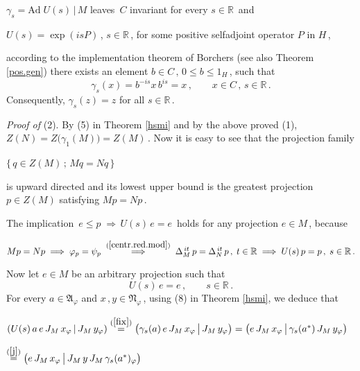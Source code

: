 \documentclass[reqno]{amsart}
\theoremstyle{definition}
\theoremstyle{remark}
\numberwithin{equation}{section}
\theoremstyle{plain}
\begin{document}
\noindent\hspace{0.6 cm} $\gamma_s =\text{Ad}\; U(s)\, |\, M$
leaves $\, C$ invariant for every $s\in\mathbb R\,$ and
\smallskip

\noindent\hspace{0.6 cm} $U(s)=\exp (isP)\,$, $s\in\mathbb R\,$,
for some positive selfadjoint operator $P$ in $H\,$,
\smallskip

\noindent according to the implementation theorem of Borchers
\cite{Bo1} (see also Theorem \ref{pos.gen}) there exists an
element $b\in C\, ,\, 0\leq b\leq 1_H\,$, such that
\begin{equation*}
\gamma_s (x) =b^{-is} x\, b^{is} =x\, ,\qquad x\in C\, ,\,
s\in\mathbb R\, .
\end{equation*}
Consequently, $\gamma_s (z) =z$ for all $s\in\mathbb R\,$.
\medskip

{\it Proof of }(2).
By (5) in Theorem \ref{hsmi} and by the above proved (1), $Z(N)=
Z\big(\gamma_1 (M)\big) =Z(M)\,$. Now it is easy to see that
the projection family
\begin{center}
$\{\, q\in Z(M)\, ;\, M q =N q\,\}$
\end{center}
is upward directed and its lowest upper bound is the greatest
projection $p\in Z(M)$ satisfying $M p =N p\,$.

The implication $\, e\leq p\;\Longrightarrow\, U(s)\, e=e\,$
holds for any projection $e\in M\,$, because
\begin{center}
$M p =N p\;\Longrightarrow\; \varphi_p =\psi_p
\;\overset{(\ref{centr.red.mod})}{\Longrightarrow}\;
\Delta_M^{\, it}\, p = \Delta_N^{\, it}\, p\, ,\; t\in\mathbb R
\;\Longrightarrow\; U(s)\, p =p\, ,\; s\in\mathbb R\, .$
\end{center}
\medskip

Now let $e\in M$ be an arbitrary projection such that
\begin{equation}\label{fix}
U(s)\, e=e\, ,\qquad s\in\mathbb R\, .
\end{equation}
For every $a\in\mathfrak A_\varphi$ and $x\, , y\in
\mathfrak N_\varphi\,$, using (8) in Theorem \ref{hsmi}, we
deduce that
\begin{center}
$( U(s)\, a\, e\, J_M\, x_\varphi\, |\, J_M\, y_\varphi )
\overset{(\ref{fix})}{=}
\big(\gamma_s (a)\, e\, J_M\, x_\varphi\,\big|\, J_M\, y_\varphi
\big) =\big( e\, J_M\, x_\varphi\,\big|\, \gamma_s (a^*)\, J_M\,
y_\varphi\big)$
\end{center}

\noindent\hspace{3.88 cm} $\overset{(\ref{j})}{=} \big( e\, J_M\,
x_\varphi\,\big|\, J_M\, y\, J_M\,\gamma_s (a^*)_\varphi\big)$
\smallskip
\end{document}
